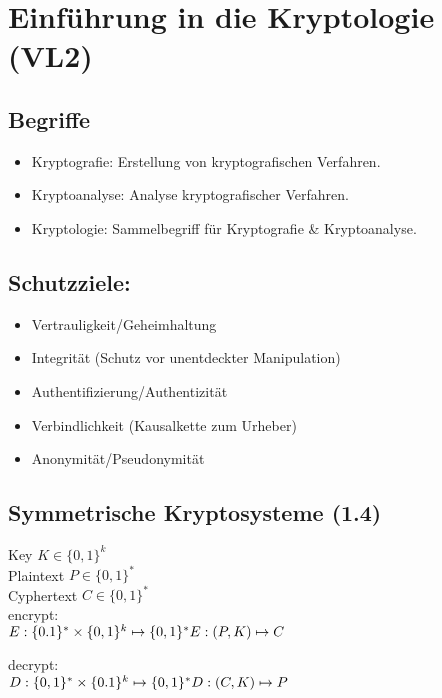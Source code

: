 \chapter{Einführung in die Kryptologie (VL2)}
\section*{Begriffe}
\begin{itemize}
  \item Kryptografie: Erstellung von kryptografischen Verfahren.
  \item Kryptoanalyse: Analyse kryptografischer Verfahren.
  \item Kryptologie: Sammelbegriff für Kryptografie \& Kryptoanalyse.
\end{itemize}

\section*{Schutzziele:}
\begin{itemize}
  \item Vertrauligkeit/Geheimhaltung
  \item Integrität (Schutz vor unentdeckter Manipulation)
  \item Authentifizierung/Authentizität
  \item Verbindlichkeit (Kausalkette zum Urheber)
  \item Anonymität/Pseudonymität
\end{itemize}

\section{Symmetrische Kryptosysteme (1.4)}
Key $K \in \{0,1\}^k$ \\
Plaintext $P \in \{0,1\}^*$ \\
Cyphertext $C \in \{0,1\}^*$ \\

encrypt:\\
\begin{math}
E: \{0.1\}^* \times \{0,1\}^k \mapsto \{0,1\}^* \\
E: (P, K) \mapsto C \\ 
\end{math}

decrypt:\\
$
D:  \{0,1\}^* \times \{0.1\}^k \mapsto \{0,1\}^* \\
D:  (C, K) \mapsto P \\ 
$

